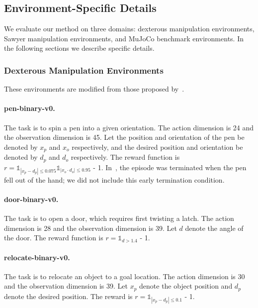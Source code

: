 \subsection{Environment-Specific Details} \label{sec:environment_impl}

We evaluate our method on three domains: dexterous manipulation environments, Sawyer manipulation environments, and MuJoCo benchmark environments. In the following sections we describe specific details.

\subsubsection{Dexterous Manipulation Environments}

These environments are modified from those proposed by~\citet{rajeswaran2018dextrous}.

\paragraph{pen-binary-v0.} The task is to spin a pen into a given orientation. The action dimension is 24 and the observation dimension is 45. Let the position and orientation of the pen be denoted by $x_p$ and $x_o$ respectively, and the desired position and orientation be denoted by $d_p$ and $d_o$ respectively. The reward function is $r = \mathds{1}_{|x_p - d_p| \leq 0.075} \mathds{1}_{|x_o \cdot d_o| \leq 0.95}$ - 1.
In~\citet{rajeswaran2018dextrous}, the episode was terminated when the pen fell out of the hand; we did not include this early termination condition.

\paragraph{door-binary-v0.} The task is to open a door, which requires first twisting a latch. The action dimension is 28 and the observation dimension is 39. Let $d$ denote the angle of the door. The reward function is $r = \mathds{1}_{d > 1.4}$ - 1.

\paragraph{relocate-binary-v0.} The task is to relocate an object to a goal location. The action dimension is 30 and the observation dimension is 39. Let $x_p$ denote the object position and $d_p$ denote the desired position. The reward is $r = \mathds{1}_{|x_p - d_p| \leq 0.1}$ - 1.

